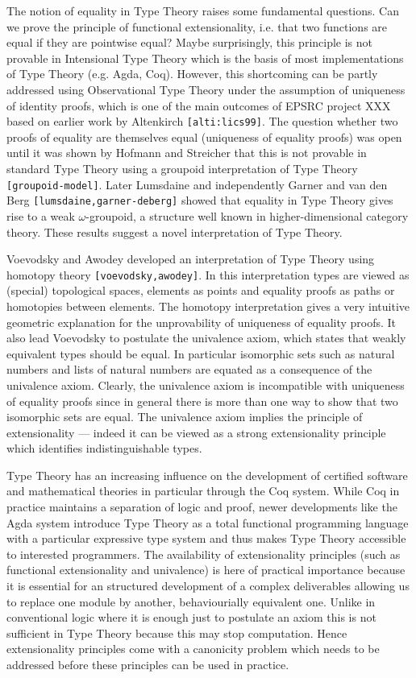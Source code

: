 \documentclass[a4paper]{article}
\renewcommand{\cite}[1]{{\tt[#1]}}
\begin{document}
The notion of equality in Type Theory raises some fundamental questions. 
Can we prove the principle of functional extensionality,
i.e. that two functions are equal if they are pointwise equal? Maybe
surprisingly, this principle is not provable in Intensional Type
Theory which is the basis of most implementations of Type Theory
(e.g. Agda, Coq). However, this shortcoming can be partly addressed
using Observational Type Theory under the assumption of uniqueness of
identity proofs, which is one of the main outcomes of EPSRC project
XXX based on earlier work by Altenkirch \cite{alti:lics99}.
The question whether two proofs of
equality are themselves equal (uniqueness of equality proofs) 
was open until it was shown by Hofmann and Streicher that this is not
provable in standard Type Theory using a groupoid interpretation of
Type Theory \cite{groupoid-model}. Later Lumsdaine and independently
Garner and van den Berg \cite{lumsdaine,garner-deberg} showed that
equality in Type Theory gives rise to a weak $\omega$-groupoid, a
structure well known in higher-dimensional category theory. These results
suggest a novel interpretation of Type Theory. 

Voevodsky and Awodey developed an interpretation of Type Theory using
homotopy theory \cite{voevodsky,awodey}. In this interpretation types
are viewed as (special) topological spaces, elements as points and
equality proofs as paths or homotopies between elements. The homotopy
interpretation gives a very intuitive geometric explanation for the
unprovability of uniqueness of equality proofs. It also lead Voevodsky
to postulate the univalence axiom, which states that weakly equivalent
types should be equal. In particular isomorphic sets such as natural
numbers and lists of natural numbers are equated as a consequence of
the univalence axiom. Clearly, the univalence axiom is incompatible
with uniqueness of equality proofs since in general there is more than
one way to show that two isomorphic sets are equal. The univalence
axiom implies the principle of extensionality --- indeed it can be viewed
as a strong extensionality principle which identifies
indistinguishable types.  

Type Theory has an increasing influence on the development of
certified software and mathematical theories in particular through the
Coq system. While Coq in practice maintains a separation of logic and
proof, newer developments like the Agda system introduce Type Theory
as a total functional programming language with a particular
expressive type system and thus makes Type Theory accessible to
interested programmers. The availability of extensionality principles
(such as functional extensionality and univalence)
is here of practical importance because it is essential for an
structured development of a complex deliverables allowing us to 
replace one module by another, behaviourially equivalent one.
Unlike in conventional logic where it is enough just to postulate an
axiom this is not sufficient in Type Theory because this may stop
computation. Hence extensionality principles come with a canonicity
problem which needs to be addressed before these principles can be used
in practice. 
\end{document}
